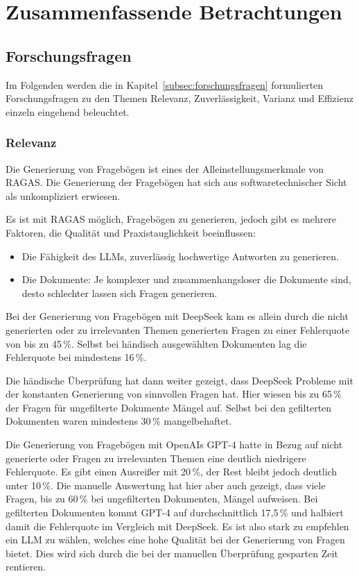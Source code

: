 \chapter{Zusammenfassende Betrachtungen}

\section{Forschungsfragen}
Im Folgenden werden die in Kapitel~\ref{subsec:forschungsfragen} formulierten Forschungsfragen zu den Themen Relevanz, Zuverlässigkeit, Varianz und Effizienz einzeln eingehend beleuchtet.

\subsection{Relevanz}
Die Generierung von Fragebögen ist eines der Alleinstellungsmerkmale von RAGAS. Die Generierung der Fragebögen hat sich aus softwaretechnischer Sicht als unkompliziert erwiesen.

Es ist mit RAGAS möglich, Fragebögen zu generieren, jedoch gibt es mehrere Faktoren, die Qualität und Praxistauglichkeit beeinflussen:
\begin{itemize}
    \item Die Fähigkeit des LLMs, zuverlässig hochwertige Antworten zu generieren.
    \item Die Dokumente: Je komplexer und zusammenhangsloser die Dokumente sind, desto schlechter lassen sich Fragen generieren.
\end{itemize}

Bei der Generierung von Fragebögen mit DeepSeek kam es allein durch die nicht generierten oder zu irrelevanten Themen generierten Fragen zu einer Fehlerquote von bis zu 45\,\%.
Selbst bei händisch ausgewählten Dokumenten lag die Fehlerquote bei mindestens 16\,\%.

Die händische Überprüfung hat dann weiter gezeigt, dass DeepSeek Probleme mit der konstanten Generierung von sinnvollen Fragen hat.
Hier wiesen bis zu 65\,\% der Fragen für ungefilterte Dokumente Mängel auf. Selbst bei den gefilterten Dokumenten waren mindestens 30\,\% mangelbehaftet.

Die Generierung von Fragebögen mit OpenAIs GPT-4 hatte in Bezug auf nicht generierte oder Fragen zu irrelevanten Themen eine deutlich niedrigere Fehlerquote.
Es gibt einen Ausreißer mit 20\,\%, der Rest bleibt jedoch deutlich unter 10\,\%.
Die manuelle Auswertung hat hier aber auch gezeigt, dass viele Fragen, bis zu 60\,\% bei ungefilterten Dokumenten, Mängel aufweisen.
Bei gefilterten Dokumenten kommt GPT-4 auf durchschnittlich 17,5\,\% und halbiert damit die Fehlerquote im Vergleich mit DeepSeek.
Es ist also stark zu empfehlen ein LLM zu wählen, welches eine hohe Qualität bei der Generierung von Fragen bietet.
Dies wird sich durch die bei der manuellen Überprüfung gesparten Zeit rentieren.


